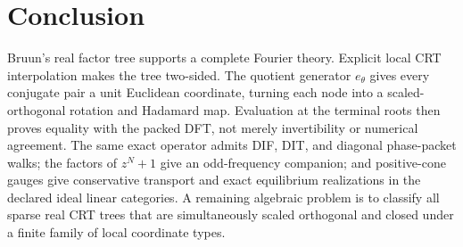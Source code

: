 \section{Conclusion}
\label{sec:conclusion}

Bruun's real factor tree supports a complete Fourier theory.  Explicit local
CRT interpolation makes the tree two-sided.  The quotient generator
$e_\theta$ gives every conjugate pair a unit Euclidean coordinate, turning each
node into a scaled-orthogonal rotation and Hadamard map.  Evaluation at the
terminal roots then proves equality with the packed DFT, not merely invertibility
or numerical agreement.  The same exact operator admits DIF, DIT, and diagonal
phase-packet walks; the factors of $z^N+1$ give an odd-frequency companion; and
positive-cone gauges give conservative transport and exact equilibrium
realizations in the declared ideal linear categories.  A remaining algebraic
problem is to classify all sparse real CRT
trees that are simultaneously scaled orthogonal and closed under a finite
family of local coordinate types.
